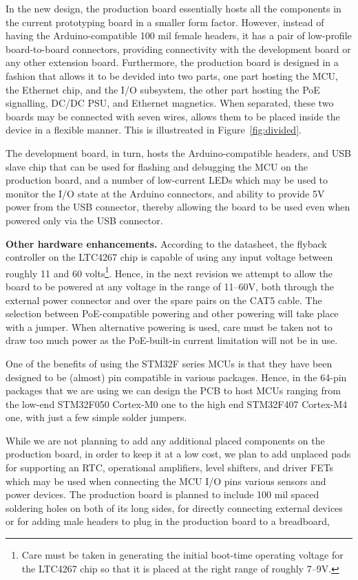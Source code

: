 \documentclass[draft,a4paper]{siamltex}
\begin{document}
In the new design, the production board essentially hosts all the
components in the current prototyping board in a smaller form factor.
However, instead of having the Arduino-compatible 100 mil female
headers, it has a pair of low-profile board-to-board connectors,
providing connectivity with the development board or any other
extension board.  Furthermore, the production board is designed in a
fashion that allows it to be devided into two parts, one part hosting
the MCU, the Ethernet chip, and the I/O subsystem, the other part hosting the
PoE signalling, DC/DC PSU, and Ethernet magnetics.  When separated,
these two boards may be connected with seven wires, allows them to be
placed inside the device in a flexible manner.  This is illustreated
in Figure~\ref{fig:divided}.

The development board, in turn, hosts the Arduino-compatible headers,
and USB slave chip that can be used for flashing and debugging the MCU
on the production board, and a number of low-current LEDs which may be
used to monitor the I/O state at the Arduino connectors, and ability
to provide 5V power from the USB connector, thereby allowing the board
to be used even when powered only via the USB connector.

{\bf Other hardware enhancements.}
According to the datasheet, the flyback controller on the LTC4267 chip
is capable of using any input voltage between roughly 11 and 60
volts\footnote{Care must be taken in generating the initial
boot-time operating voltage for the LTC4267 chip so that it is placed
at the right range of roughly 7--9V.}.  Hence, in the next revision we
attempt to allow the board to be powered at any voltage in the range
of 11--60V, both through the external power connector and over the
spare pairs on the CAT5 cable.  The selection between PoE-compatible
powering and other powering will take place with a jumper.  When
alternative powering is used, care must be taken not to draw too much
power as the PoE-built-in current limitation will not be in use.

One of the benefits of using the STM32F series MCUs is that they have
been designed to be (almost) pin compatible in various packages.
Hence, in the 64-pin packages that we are using we can design the PCB
to host MCUs ranging from the low-end STM32F050 Cortex-M0 one to the
high end STM32F407 Cortex-M4 one, with just a few simple solder
jumpers.

While we are not planning to add any additional placed components on
the production board, in order to keep it at a low cost, we plan to
add unplaced pads for supporting an RTC, operational amplifiers, level
shifters, and driver FETs which may be used when connecting the MCU
I/O pins various sensors and power devices.  The production board is
planned to include 100 mil spaced soldering holes on both of its long
sides, for directly connecting external devices or for adding male
headers to plug in the production board to a breadboard,
\end{document}
